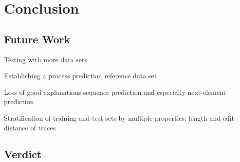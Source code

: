 \chapter{Conclusion} \label{chap:conclusion}

\section{Future Work} \label{sec:conclusion:future-work}
Testing with more data sets

Establishing a process prediction reference data set

Loss of good explanations sequence prediction and especially next-element prediction

Stratification of training and test sets by multiple properties: length and edit-distance of traces



\section{Verdict} \label{sec:conclusion:verdict}
